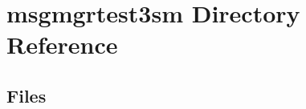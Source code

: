 \section{msgmgrtest3sm Directory Reference}
\label{dir_82804985da00d9d68446da0fa694f612}
\subsection*{Files}
\begin{DoxyCompactItemize}
\end{DoxyCompactItemize}
